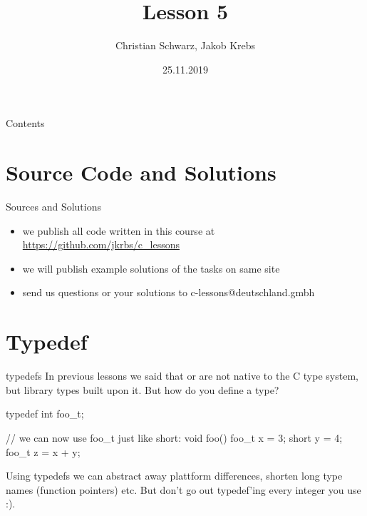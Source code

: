 \documentclass[10pt,graphics,aspectratio=169,table]{beamer}
\title{Lesson 5}
\author{Christian Schwarz, Jakob Krebs}
\date{25.11.2019}
\begin{document}
\maketitle

\begin{frame}{Contents}
    \tableofcontents
\end{frame}


\section{Source Code and Solutions}
\begin{frame}{Sources and Solutions}
    \begin{itemize}
        \item we publish all code written in this course at \url{https://github.com/jkrbs/c_lessons}
        \item we will publish example solutions of the tasks on same site
        \item send us questions or your solutions to c-lessons@deutschland.gmbh
    \end{itemize}
\end{frame}

\section{Typedef}
\begin{frame}[fragile]{typedefs}
    In previous lessons we said that  or  are not
    native to the C type system, but library types built upon it.
    But how do you define a type?

    \begin{codeblock}
typedef int foo_t;

// we can now use foo_t just like short:
void foo(){
    foo_t x = 3;
    short y = 4;
    foo_t z = x + y;
}
    \end{codeblock}

    Using typedefs we can abstract away plattform differences,
    shorten long type names (function pointers) etc.
    But don't go out typedef'ing every integer you use :).
\end{frame}
\end{document}

